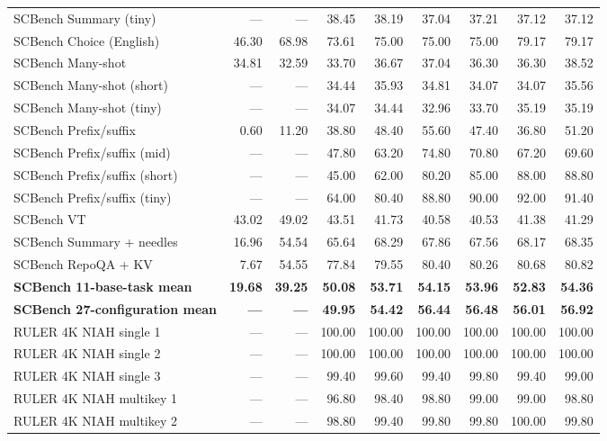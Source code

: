 \begin{longtable}{@{}lrrrrrrrr@{}}
SCBench Summary (tiny) & --- & --- & 38.45 & 38.19 & 37.04 & 37.21 & 37.12 & 37.12 \\
SCBench Choice (English) & 46.30 & 68.98 & 73.61 & 75.00 & 75.00 & 75.00 & 79.17 & 79.17 \\
SCBench Many-shot & 34.81 & 32.59 & 33.70 & 36.67 & 37.04 & 36.30 & 36.30 & 38.52 \\
SCBench Many-shot (short) & --- & --- & 34.44 & 35.93 & 34.81 & 34.07 & 34.07 & 35.56 \\
SCBench Many-shot (tiny) & --- & --- & 34.07 & 34.44 & 32.96 & 33.70 & 35.19 & 35.19 \\
SCBench Prefix/suffix & 0.60 & 11.20 & 38.80 & 48.40 & 55.60 & 47.40 & 36.80 & 51.20 \\
SCBench Prefix/suffix (mid) & --- & --- & 47.80 & 63.20 & 74.80 & 70.80 & 67.20 & 69.60 \\
SCBench Prefix/suffix (short) & --- & --- & 45.00 & 62.00 & 80.20 & 85.00 & 88.00 & 88.80 \\
SCBench Prefix/suffix (tiny) & --- & --- & 64.00 & 80.40 & 88.80 & 90.00 & 92.00 & 91.40 \\
SCBench VT & 43.02 & 49.02 & 43.51 & 41.73 & 40.58 & 40.53 & 41.38 & 41.29 \\
SCBench Summary + needles & 16.96 & 54.54 & 65.64 & 68.29 & 67.86 & 67.56 & 68.17 & 68.35 \\
SCBench RepoQA + KV & 7.67 & 54.55 & 77.84 & 79.55 & 80.40 & 80.26 & 80.68 & 80.82 \\
\hline
\textbf{SCBench 11-base-task mean} & \textbf{19.68} & \textbf{39.25} & \textbf{50.08} & \textbf{53.71} & \textbf{54.15} & \textbf{53.96} & \textbf{52.83} & \textbf{54.36} \\
\hline
\hline
\textbf{SCBench 27-configuration mean} & \textbf{---} & \textbf{---} & \textbf{49.95} & \textbf{54.42} & \textbf{56.44} & \textbf{56.48} & \textbf{56.01} & \textbf{56.92} \\
\hline
\pagebreak[4]
RULER 4K NIAH single 1 & --- & --- & 100.00 & 100.00 & 100.00 & 100.00 & 100.00 & 100.00 \\
RULER 4K NIAH single 2 & --- & --- & 100.00 & 100.00 & 100.00 & 100.00 & 100.00 & 100.00 \\
RULER 4K NIAH single 3 & --- & --- & 99.40 & 99.60 & 99.40 & 99.80 & 99.40 & 99.00 \\
RULER 4K NIAH multikey 1 & --- & --- & 96.80 & 98.40 & 98.80 & 99.00 & 99.00 & 98.80 \\
RULER 4K NIAH multikey 2 & --- & --- & 98.80 & 99.40 & 99.80 & 99.80 & 100.00 & 99.80 \\

\end{longtable}
